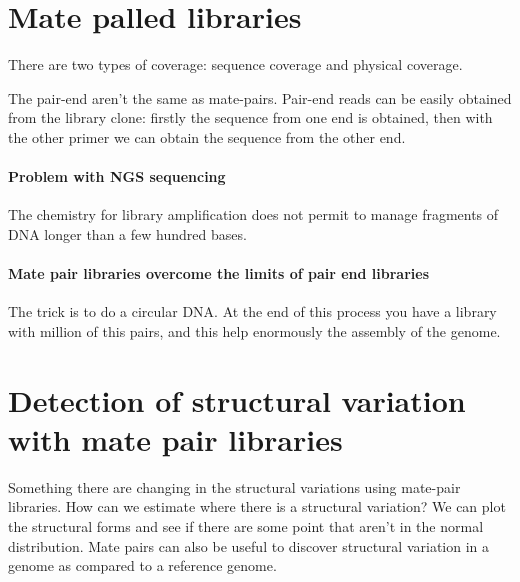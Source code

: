 \section{Mate palled libraries}

There are two types of coverage: sequence coverage and physical coverage.

The pair-end aren't the same as mate-pairs.
Pair-end reads can be easily obtained from the library clone: firstly the 
sequence from one end is obtained, then with the other primer we can obtain the 
sequence from the other end.

\paragraph*{Problem with NGS sequencing} The chemistry for library 
amplification does not permit to manage fragments of DNA longer than a few 
hundred bases.
\paragraph*{Mate pair libraries overcome the limits of pair end libraries} The 
trick is to do a circular DNA. At the end of this process you have a library 
with million of this pairs, and this help enormously the assembly of the genome.

\section{Detection of structural variation with mate pair libraries}

Something there are changing in the structural variations using mate-pair 
libraries.
How can we estimate where there is a structural variation? We can plot the 
structural forms and see if there are some point that aren't in the normal 
distribution. Mate pairs can also be useful to discover structural variation in 
a genome as compared to a reference genome.
